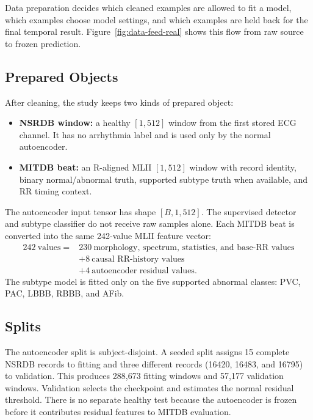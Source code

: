 Data preparation decides which cleaned examples are allowed to fit a model,
which examples choose model settings, and which examples are held back for the
final temporal result. Figure~\ref{fig:data-feed-real} shows this flow from
raw source to frozen prediction.

\subsection{Prepared Objects}

After cleaning, the study keeps two kinds of prepared object:
\begin{itemize}
    \item \textbf{NSRDB window:} a healthy $[1,512]$ window from the first
    stored ECG channel. It has no arrhythmia label and is used only by the
    normal autoencoder.
    \item \textbf{MITDB beat:} an R-aligned MLII $[1,512]$ window with record
    identity, binary normal/abnormal truth, supported subtype truth when
    available, and RR timing context.
\end{itemize}

The autoencoder input tensor has shape $[B,1,512]$. The supervised detector and
subtype classifier do not receive raw samples alone. Each MITDB beat is
converted into the same 242-value MLII feature vector:
\[
\begin{aligned}
242\ \text{values}={}&230\ \text{morphology, spectrum, statistics, and base-RR values}\\
&+8\ \text{causal RR-history values}\\
&+4\ \text{autoencoder residual values}.
\end{aligned}
\]
The subtype model is fitted only on the five supported abnormal classes: PVC,
PAC, LBBB, RBBB, and AFib.

\subsection{Splits}

The autoencoder split is subject-disjoint. A seeded split assigns 15 complete
NSRDB records to fitting and three different records (16420, 16483, and 16795)
to validation. This produces 288,673 fitting windows and 57,177 validation
windows. Validation selects the checkpoint and estimates the normal residual
threshold. There is no separate healthy test because the autoencoder is frozen
before it contributes residual features to MITDB evaluation.

